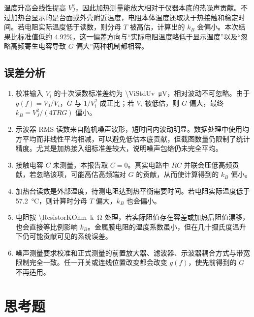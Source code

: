 \documentclass[11pt]{article}
\begin{document}
温度升高会线性提高 $V_J^2$，因此加热测量能放大相对于仪器本底的热噪声贡献。不过加热台显示的是台面或外壳附近温度，电阻本体温度还取决于热接触和稳定时间。若电阻实际温度低于读数，则分母 $T$ 被高估，计算出的 $k_B$ 会偏小。本次结果比标准值低约 $4.92\%$，这一偏差方向与“实际电阻温度略低于显示温度”以及“忽略高频寄生电容导致 $G$ 偏大”两种机制都相容。

\subsection{误差分析}

\begin{enumerate}
    \item 校准输入 $V_i$ 的十次读数标准差约为 \SI{\ViStdUv}{\micro V}，相对波动不可忽略。由于 $g(f)=V_0/V_i$，$G$ 与 $1/V_i^2$ 成正比；若 $V_i$ 被低估，则 $G$ 偏大，最终 $k_B=V_J^2/(4TRG)$ 偏小。
    \item 示波器 RMS 读数来自随机噪声波形，短时间内波动明显。数据处理中使用均方平均而非线性平均相减，可以避免低估本底贡献，但截图数量仍限制了统计精度。尤其是加热接入组标准差较大，说明噪声包络仍未完全平均。
    \item 接触电容 $C$ 未测量，本报告取 $C=0$。真实电路中 $RC$ 并联会压低高频贡献，若忽略该项，可能高估高频端对 $G$ 的贡献，从而使计算得到的 $k_B$ 偏小。
    \item 加热台读数是外部温度，待测电阻达到热平衡需要时间。若电阻实际温度低于 \SI{57.2}{\degreeCelsius}，则计算时分母 $T$ 偏大，$k_B$ 也会偏小。
    \item 电阻按 \SI{\ResistorKOhm}{k\ohm} 处理，若实际阻值存在容差或加热后阻值漂移，也会直接等比例影响 $k_B$。金属膜电阻的温度系数虽小，但在几十摄氏度温升下仍可能贡献可见的系统误差。
    \item 噪声测量要求校准和正式测量的前置放大器、滤波器、示波器耦合方式与带宽限制完全一致。任一开关或连线位置改变都会改变 $g(f)$，使先前得到的 $G$ 不再适用。
\end{enumerate}

\section{思考题}
\end{document}
